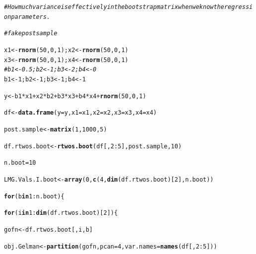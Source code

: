 \documentclass[11pt,a4paper,twoside]{book}
\makeatletter
\newcommand{\hlnum}[1]{\textcolor[rgb]{0.686,0.059,0.569}{#1}}%
\newcommand{\hlcom}[1]{\textcolor[rgb]{0.678,0.584,0.686}{\textit{#1}}}%
\newcommand{\hlopt}[1]{\textcolor[rgb]{0,0,0}{#1}}%
\newcommand{\hlstd}[1]{\textcolor[rgb]{0.345,0.345,0.345}{#1}}%
\newcommand{\hlkwa}[1]{\textcolor[rgb]{0.161,0.373,0.58}{\textbf{#1}}}%
\newcommand{\hlkwb}[1]{\textcolor[rgb]{0.69,0.353,0.396}{#1}}%
\newcommand{\hlkwc}[1]{\textcolor[rgb]{0.333,0.667,0.333}{#1}}%
\newcommand{\hlkwd}[1]{\textcolor[rgb]{0.737,0.353,0.396}{\textbf{#1}}}%
\newenvironment{kframe}{%
 \def\at@end@of@kframe{}%
 \ifinner\ifhmode%
  \def\at@end@of@kframe{\end{minipage}}%
  \begin{minipage}{\columnwidth}%
 \fi\fi%
 \def\FrameCommand##1{\hskip\@totalleftmargin \hskip-\fboxsep
 \colorbox{shadecolor}{##1}\hskip-\fboxsep
     \hskip-\linewidth \hskip-\@totalleftmargin \hskip\columnwidth}%
 \MakeFramed {\advance\hsize-\width
   \@totalleftmargin\z@ \linewidth\hsize
   \@setminipage}}%
 {\par\unskip\endMakeFramed%
 \at@end@of@kframe}
\newenvironment{knitrout}{}{} %
\makeatother
\begin{document}
\begin{knitrout}
\color{fgcolor}\begin{kframe}
\begin{alltt}
\hlcom{#How much variance is effectively in the bootstrap matrix when we know the regression parameters.}

\hlcom{#fake post sample}

\hlstd{x1} \hlkwb{<-} \hlkwd{rnorm}\hlstd{(}\hlnum{50}\hlstd{,} \hlnum{0}\hlstd{,} \hlnum{1}\hlstd{); x2} \hlkwb{<-} \hlkwd{rnorm}\hlstd{(}\hlnum{50}\hlstd{,} \hlnum{0}\hlstd{,} \hlnum{1}\hlstd{)}
\hlstd{x3} \hlkwb{<-} \hlkwd{rnorm}\hlstd{(}\hlnum{50}\hlstd{,} \hlnum{0}\hlstd{,} \hlnum{1}\hlstd{); x4} \hlkwb{<-} \hlkwd{rnorm}\hlstd{(}\hlnum{50}\hlstd{,} \hlnum{0}\hlstd{,} \hlnum{1}\hlstd{)}
\hlcom{#b1 <- 0.5; b2 <- 1; b3 <- 2; b4 <- 0}
\hlstd{b1} \hlkwb{<-} \hlnum{1}\hlstd{; b2} \hlkwb{<-} \hlnum{1}\hlstd{; b3} \hlkwb{<-} \hlnum{1}\hlstd{; b4} \hlkwb{<-} \hlnum{1}

\hlstd{y} \hlkwb{<-} \hlstd{b1}\hlopt{*}\hlstd{x1} \hlopt{+} \hlstd{x2}\hlopt{*}\hlstd{b2} \hlopt{+} \hlstd{b3}\hlopt{*}\hlstd{x3} \hlopt{+} \hlstd{b4}\hlopt{*}\hlstd{x4} \hlopt{+} \hlkwd{rnorm}\hlstd{(}\hlnum{50}\hlstd{,} \hlnum{0}\hlstd{,} \hlnum{1}\hlstd{)}

\hlstd{df} \hlkwb{<-} \hlkwd{data.frame}\hlstd{(}\hlkwc{y} \hlstd{= y,} \hlkwc{x1} \hlstd{= x1,} \hlkwc{x2} \hlstd{= x2,} \hlkwc{x3} \hlstd{= x3,} \hlkwc{x4} \hlstd{= x4)}

\hlstd{post.sample} \hlkwb{<-} \hlkwd{matrix}\hlstd{(}\hlnum{1}\hlstd{,} \hlnum{1000}\hlstd{,}\hlnum{5}\hlstd{)}

\hlstd{df.rtwos.boot} \hlkwb{<-}\hlkwd{rtwos.boot}\hlstd{(df[,}\hlnum{2}\hlopt{:}\hlnum{5}\hlstd{], post.sample,} \hlnum{10}\hlstd{)}

\hlstd{n.boot} \hlkwb{=} \hlnum{10}

\hlstd{LMG.Vals.I.boot}\hlkwb{<-}\hlkwd{array}\hlstd{(}\hlnum{0}\hlstd{,} \hlkwd{c}\hlstd{(}\hlnum{4}\hlstd{,}\hlkwd{dim}\hlstd{(df.rtwos.boot)[}\hlnum{2}\hlstd{], n.boot))}

\hlkwa{for} \hlstd{(b} \hlkwa{in} \hlnum{1}\hlopt{:}\hlstd{n.boot)\{}

\hlkwa{for}\hlstd{(i} \hlkwa{in} \hlnum{1}\hlopt{:}\hlkwd{dim}\hlstd{(df.rtwos.boot)[}\hlnum{2}\hlstd{])\{}

        \hlstd{gofn}\hlkwb{<-}\hlstd{df.rtwos.boot[,i,b]}

        \hlstd{obj.Gelman}\hlkwb{<-}\hlkwd{partition}\hlstd{(gofn,} \hlkwc{pcan} \hlstd{=} \hlnum{4}\hlstd{,} \hlkwc{var.names} \hlstd{=} \hlkwd{names}\hlstd{(df[,}\hlnum{2}\hlopt{:}\hlnum{5}\hlstd{]))}


\end{alltt}
\end{kframe}
\end{knitrout}
\end{document}
